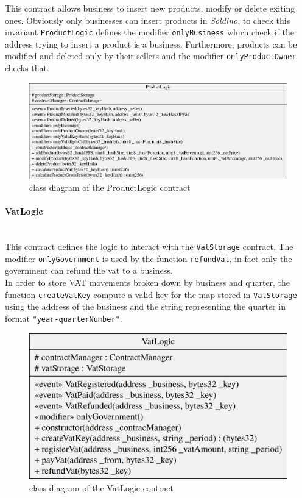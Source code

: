 \noindent This contract allows business to insert new products, modify or delete exiting ones. Obviously only businesses can insert products in \textit{Soldino}, to check this invariant \texttt{ProductLogic} defines the modifier \texttt{onlyBusiness} which check if the address trying to insert a product is a business. Furthermore, products can be modified and deleted only by their sellers and the modifier \texttt{onlyProductOwner} checks that.
\begin{figure}[H]
	\centering
	\includegraphics[scale=0.25]{res/images/solidity/productlogic.png}
	\caption{class diagram of the ProductLogic contract}
\end{figure}

\paragraph{VatLogic}\mbox{}\\

\noindent This contract defines the logic to interact with the \texttt{VatStorage} contract. The modifier \texttt{onlyGovernment} is used by the function \texttt{refundVat}, in fact only the government can refund the vat to a business. \\
In order to store VAT movements broken down by business and quarter, the function \texttt{createVatKey} compute a valid key for the map stored in \texttt{VatStorage} using the address of the business and the string representing the quarter in format \texttt{"year-quarterNumber"}. 
\begin{figure}[H]
	\centering
	\includegraphics[scale=0.20]{res/images/solidity/vatlogic.png}
	\caption{class diagram of the VatLogic contract}
\end{figure}
\pagebreak
